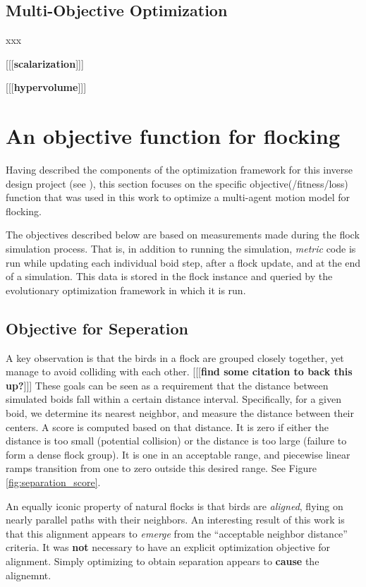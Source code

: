\documentclass[letterpaper]{article}
\begin{document}
\subsection{Multi-Objective Optimization}
\label{subsec:Multi-Objective}

xxx

[[[\textbf{scalarization}]]]

[[[\textbf{hypervolume}]]]

\section{An objective function for flocking}
\label{sec:flocking_objecdtive}

Having described the components of the optimization framework for this inverse design project (see ), this section focuses on the specific objective(/fitness/loss) function that was used in this work to optimize a multi-agent motion model for flocking.

The objectives described below are based on measurements made during the flock simulation process. That is, in addition to running the simulation, \textit{metric} code is run while updating each individual boid step, after a flock update, and at the end of a simulation. This data is stored in the flock instance and queried by the evolutionary optimization framework in which it is run.

\subsection{Objective for Seperation}
\label{subsec:seperation_objective}

A key observation is that the birds in a flock are grouped closely together, yet manage to avoid colliding with each other. [[[\textbf{find some citation to back this up?}]]] These goals can be seen as a requirement that the distance between simulated boids fall within a certain distance interval. Specifically, for a given boid, we determine its nearest neighbor, and measure the distance between their centers. A score is computed based on that distance. It is zero if either the distance is too small (potential collision) or the distance is too large (failure to form a dense flock group). It is one in an acceptable range, and piecewise linear ramps transition from one to zero outside this desired range. See Figure \ref{fig:separation_score}.

An equally iconic property of natural flocks is that birds are \textit{aligned}, flying on nearly parallel paths with their neighbors. An interesting result of this work is that this alignment appears to \textit{emerge} from the ``acceptable neighbor distance'' criteria. It was \textbf{not} necessary to have an explicit optimization objective for alignment. Simply optimizing to obtain separation appears to \textbf{cause} the alignemnt.
\end{document}
